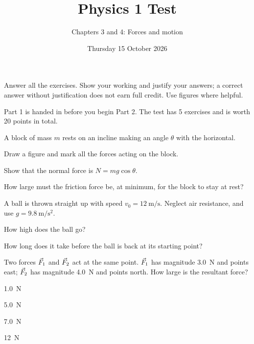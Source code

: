\documentclass[12pt]{article}
\title{Physics 1 Test}
\subtitle{Chapters 3 and 4: Forces and motion}
\date{Thursday 15 October 2026}
\begin{document}
\maketitle

Answer all the exercises. Show your working and justify your answers; a correct answer without justification does not earn full credit. Use figures where helpful.

Part 1 is handed in before you begin Part 2. The test has 5 exercises and is worth 20 points in total.


%


\begin{exercise}
A block of mass $m$ rests on an incline making an angle $\theta$ with the horizontal.

\begin{subproblems}
  \item Draw a figure and mark all the forces acting on the block.
  \item Show that the normal force is $N = mg\cos\theta$.
  \item How large must the friction force be, at minimum, for the block to stay at rest?
\end{subproblems}
\end{exercise}


\begin{exercise}
A ball is thrown straight up with speed $v_0 = \qty{12}{\metre\per\second}$. Neglect air resistance, and use $g = \qty{9.8}{\metre\per\second\squared}$.

\begin{subproblems}
  \item How high does the ball go?
  \item How long does it take before the ball is back at its starting point?
\end{subproblems}
\end{exercise}


\begin{exercise}
Two forces $\vv{F}_1$ and $\vv{F}_2$ act at the same point. $\vv{F}_1$ has magnitude \qty{3.0}{\newton} and points east; $\vv{F}_2$ has magnitude \qty{4.0}{\newton} and points north. How large is the resultant force?
\begin{multiplechoice}
  \item \qty{1.0}{\newton}
  \item \qty{5.0}{\newton}
  \item \qty{7.0}{\newton}
  \item \qty{12}{\newton}
\end{multiplechoice}
\end{exercise}
\end{document}
